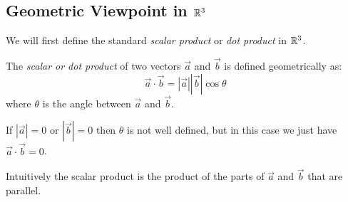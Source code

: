 \documentclass[../main.tex]{subfiles}
\begin{document}
\subsection{Geometric Viewpoint in \texorpdfstring{$\mathbb{R}^{3}$}{3 dimensions}}
We will first define the standard \textit{scalar product} or \textit{dot product} in $\mathbb{R}^{3}$.
\begin{definition}
  The \textit{scalar or dot product} of two vectors $\vec{a}$ and $\vec{b}$ is defined geometrically as:
  \[
    \vec{a} \cdot \vec{b} = |\vec{a}||\vec{b}|\cos\theta
  \]
  where $\theta$ is the angle between $\vec{a}$ and $\vec{b}$.
\end{definition}
\begin{remark}[Note]
  If $|\vec{a}| = 0$ or $|\vec{b}| = 0$ then $\theta$ is not well defined, but in this case we just have $\vec{a} \cdot \vec{b} = 0$.
\end{remark}
Intuitively the scalar product is the product of the parts of $\vec{a}$ and $\vec{b}$ that are parallel.
\end{document}
